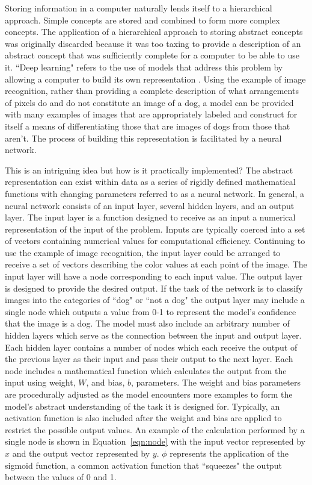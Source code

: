 \documentclass[letterpaper, 12pt, captions=tableabove]{scrreprt}
\begin{document}
			Storing information in a computer naturally lends itself to a hierarchical approach. Simple concepts are stored and combined to form more complex concepts. The application of a hierarchical approach to storing abstract concepts was originally discarded because it was too taxing to provide a description of an abstract concept that was sufficiently complete for a computer to be able to use it. ``Deep learning" refers to the use of models that address this problem by allowing a computer to build its own representation \cite{bengio2017}. Using the example of image recognition, rather than providing a complete description of what arrangements of pixels do and do not constitute an image of a dog, a model can be provided with many examples of images that are appropriately labeled and construct for itself a means of differentiating those that are images of dogs from those that aren't. The process of building this representation is facilitated by a neural network.

			This is an intriguing idea but how is it practically implemented? The abstract representation can exist within data as a series of rigidly defined mathematical functions with changing parameters referred to as a neural network. In general, a neural network consists of an input layer, several hidden layers, and an output layer. The input layer is a function designed to receive as an input a numerical representation of the input of the problem. Inputs are typically coerced into a set of vectors containing numerical values for computational efficiency. Continuing to use the example of image recognition, the input layer could be arranged to receive a set of vectors describing the color values at each point of the image. The input layer will have a node corresponding to each input value. The output layer is designed to provide the desired output. If the task of the network is to classify images into the categories of ``dog" or ``not a dog" the output layer may include a single node which outputs a value from 0-1 to represent the model's confidence that the image is a dog. The model must also include an arbitrary number of hidden layers which serve as the connection between the input and output layer. Each hidden layer contains a number of nodes which each receive the output of the previous layer as their input and pass their output to the next layer. Each node includes a mathematical function which calculates the output from the input using weight, $W$,  and bias, $b$, parameters. The weight and bias parameters are procedurally adjusted as the model encounters more examples to form the model's abstract understanding of the task it is designed for. Typically, an activation function is also included after the weight and bias are applied to restrict the possible output values. An example of the calculation performed by a single node is shown in Equation~\ref{eqn:node} with the input vector represented by $x$ and the output vector represented by $y$. $\phi$ represents the application of the sigmoid function, a common activation function that ``squeezes" the output between the values of 0 and 1.
\end{document}
